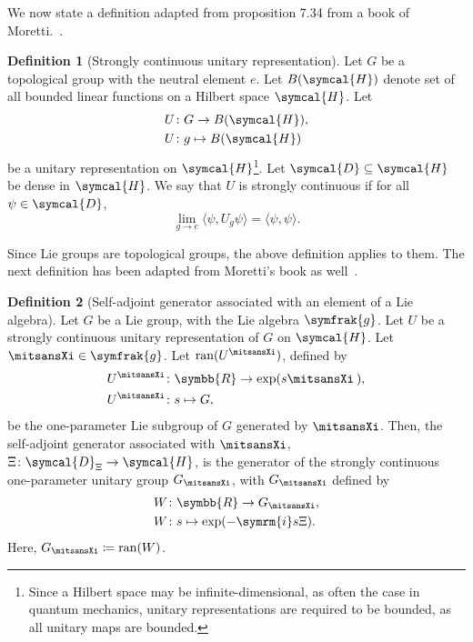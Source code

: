 \documentclass[12pt, a4 paper]{article}
\theoremstyle{definition}
\newtheorem{defn}{Definition}
\newcommand{\rr}{\symbb{R}}
\newcommand{\hilbert}{\symcal{H}}
\renewcommand{\i}{\symrm{i}}
\newcommand{\domain}{\symcal{D}}
\begin{document}
    We now state a definition adapted from proposition 7.34 from a book of Moretti.~\cite[p.~287]{MorettiFundamental}.
    \begin{defn}[Strongly continuous unitary representation]
        Let \(G\) be a topological group with the neutral element \(e\). Let \(B(\hilbert)\) denote set of all bounded linear functions on a Hilbert space \(\hilbert\). Let
        \begin{align*}
            U &\colon G \rightarrow B(\hilbert),\\
            U &\colon g \mapsto B(\hilbert)
        \end{align*}
        be a unitary representation on \(\hilbert\)\footnote{Since a Hilbert space may be infinite-dimensional, as often the case in quantum mechanics, unitary representations are required to be bounded, as all unitary maps are bounded.}. Let \(\domain \subseteq \hilbert\) be dense in \(\hilbert\). We say that \(U\) is strongly continuous if for all \(\psi \in \domain\),
        \[
            \lim_{g \rightarrow e} \langle\psi, U_g\psi\rangle = \langle\psi, \psi\rangle.
        \]
    \end{defn}
    Since Lie groups are topological groups, the above definition applies to them. The next definition has been adapted from Moretti's book as well~\cite[p.~288]{MorettiFundamental}.
    \begin{defn}[Self-adjoint generator associated with an element of a Lie algebra]
        Let \(G\) be a Lie group, with the Lie algebra \(\symfrak{g}\). Let \(U\) be a strongly continuous unitary representation of \(G\) on \(\hilbert\). Let \(\mitsansXi \in \symfrak{g}\). Let \(\operatorname{ran}(U^{\mitsansXi})\), defined by
        \begin{align*}
            U^{\mitsansXi} &\colon \rr \rightarrow \exp(s\mitsansXi\kern2.1pt),\\
            U^{\mitsansXi} &\colon s \mapsto G,
        \end{align*}
        be the one-parameter Lie subgroup of \(G\) generated by \(\mitsansXi\). Then, the self-adjoint generator associated with \(\mitsansXi\), \(\Xi \colon \domain_{\Xi} \rightarrow \hilbert\), is the generator of the strongly continuous one-parameter unitary group \(G_{\mitsansXi}\), with \(G_{\mitsansXi}\) defined by
        \begin{align*}
            W &\colon \rr \rightarrow G_{\mitsansXi},\\
            W &\colon s \mapsto \exp(-\i s \Xi).
        \end{align*}
        Here, \(G_{\mitsansXi} \coloneq \operatorname{ran}(W)\).
    \end{defn}
\end{document}
